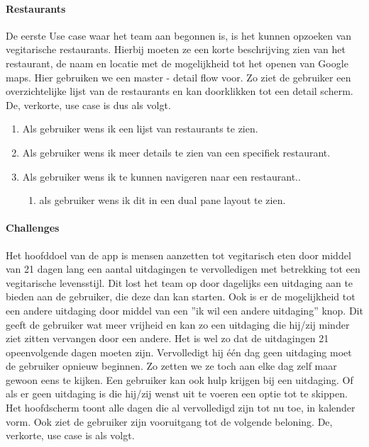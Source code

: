 \paragraph{Restaurants}

De eerste Use case waar het team aan begonnen is, is het kunnen opzoeken van vegitarische restaurants. Hierbij moeten ze een korte beschrijving zien van het restaurant, de naam en locatie met de mogelijkheid tot het openen van Google maps. Hier gebruiken we een master - detail flow voor. Zo ziet de gebruiker een overzichtelijke lijst van de restaurants en kan doorklikken tot een detail scherm. De, verkorte, use case is dus als volgt.

\begin{enumerate}
	\item Als gebruiker wens ik een lijst van restaurants te zien.
	\item Als gebruiker wens ik meer details te zien van een specifiek restaurant.
	\item Als gebruiker wens ik te kunnen navigeren naar een restaurant..
	 \begin{enumerate}
		\item als gebruiker wens ik dit in een dual pane layout te zien.
	\end{enumerate}
\end{enumerate}

\paragraph{Challenges}

Het hoofddoel van de app is mensen aanzetten tot vegitarisch eten door middel van 21 dagen lang een aantal uitdagingen te vervolledigen met betrekking tot een vegitarische levensstijl. Dit lost het team op door dagelijks een uitdaging aan te bieden aan de gebruiker, die deze dan kan starten. Ook is er de mogelijkheid tot een andere uitdaging door middel van een ''ik wil een andere uitdaging'' knop. Dit geeft de gebruiker wat meer vrijheid en kan zo een uitdaging die hij/zij minder ziet zitten vervangen door een andere. Het is wel zo dat de uitdagingen 21 opeenvolgende dagen moeten zijn. Vervolledigt hij één dag geen uitdaging moet de gebruiker opnieuw beginnen. Zo zetten we ze toch aan elke dag zelf maar gewoon eens te kijken. Een gebruiker kan ook hulp krijgen bij een uitdaging. Of als er geen uitdaging is die hij/zij wenst uit te voeren een optie tot te skippen. Het hoofdscherm toont alle dagen die al vervolledigd zijn tot nu toe, in kalender vorm. Ook ziet de gebruiker zijn vooruitgang tot de volgende beloning. De, verkorte, use case is als volgt.

